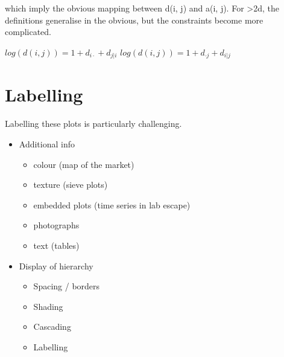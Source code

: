 \documentclass[letterpaper,oneside]{scrartcl}
\begin{document}
which imply the obvious mapping between d(i, j) and a(i, j).  For >2d,
the definitions generalise in the obvious, but the constraints become
more complicated.

$log(d(i,j)) = 1 + d_{i \cdot} + d_{j|i}$
$log(d(i,j)) = 1 + d_{\cdot j} + d_{i|j}$

\section{Labelling}
\label{sec:legends}

Labelling these plots is particularly challenging.

\begin{itemize}
  \item Additional info 
  \begin{itemize}
    \item colour (map of the market)
    \item texture (sieve plots)
    \item embedded plots (time series in lab escape)
    \item photographs
    \item text (tables)
  \end{itemize}
  
  \item Display of hierarchy
  \begin{itemize}
    \item Spacing / borders
    \item Shading
    \item Cascading
    \item Labelling
  \end{itemize}
\end{itemize}


\end{document}
